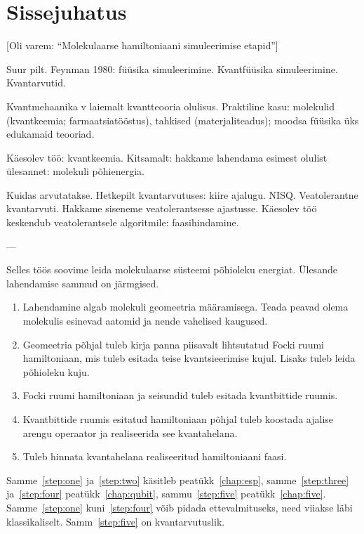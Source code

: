 \documentclass[12pt]{report}
\begin{document}
\tableofcontents


\chapter{Sissejuhatus}

[Oli varem: ``Molekulaarse hamiltoniaani simuleerimise etapid'']

Suur pilt. Feynman 1980: füüsika simuleerimine. Kvantfüüsika simuleerimine.
Kvantarvutid.

Kvantmehaanika v laiemalt kvantteooria olulisus. Praktiline kasu: molekulid
(kvantkeemia; farmaatsiatööstus), tahkised (materjaliteadus); moodsa füüsika
üks edukamaid teooriad.

Käesolev töö: kvantkeemia. Kitsamalt: hakkame lahendama esimest olulist
ülesannet: molekuli põhienergia.

Kuidas arvutatakse. Hetkepilt kvantarvutuses: kiire ajalugu. NISQ.
Veatolerantne kvantarvuti. Hakkame siseneme veatolerantsesse ajastusse.
Käesolev töö keskendub veatolerantsele algoritmile: faasihindamine.

---

Selles töös soovime leida molekulaarse süsteemi põhioleku energiat. Ülesande
lahendamise sammud on järmgised.

\begin{enumerate}
    \item\label{step:one} Lahendamine algab molekuli geomeetria määramisega.
    Teada peavad olema molekulis esinevad aatomid ja nende vahelised kaugused.
    \item\label{step:two} Geomeetria põhjal tuleb kirja panna piisavalt lihtsutatud Focki ruumi hamiltoniaan, mis tuleb esitada teise kvantsieerimise kujul.
    Lisaks tuleb leida põhioleku kuju.
    \item\label{step:three} Focki ruumi hamiltoniaan ja seisundid tuleb esitada kvantbittide ruumis.
    \item\label{step:four}  Kvantbittide ruumis esitatud hamiltoniaan põhjal tuleb koostada ajalise arengu operaator ja realiseerida see kvantahelana.
    \item\label{step:five}  Tuleb hinnata kvantahelana realiseeritud hamiltoniaani faasi.
\end{enumerate}

Samme~\ref{step:one} ja~\ref{step:two} käsitleb peatükk~\ref{chap:esp},
samme~\ref{step:three} ja~\ref{step:four} peatükk~\ref{chap:qubit},
sammu~\ref{step:five} peatükk~\ref{chap:five}. Samme~\ref{step:one}
kuni~\ref{step:four} võib pidada ettevalmituseks, need viiakse läbi
klassikaliselt. Samm~\ref{step:five} on kvantarvutuslik.
\end{document}
